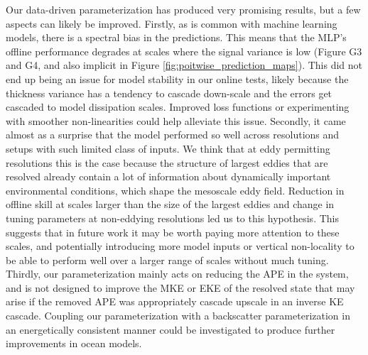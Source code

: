\documentclass[draft]{agujournal2019}
\begin{document}

Our data-driven parameterization has produced very promising results, but a few aspects can likely be improved. Firstly, as is common with machine learning models, there is a spectral bias in the predictions. This means that the MLP's offline performance degrades at scales where the signal variance is low (Figure G3 and G4, and also implicit in Figure \ref{fig:poitwise_prediction_maps}). This did not end up being an issue for model stability in our online tests, likely because the thickness variance has a tendency to cascade down-scale and the errors get cascaded to model dissipation scales. Improved loss functions or experimenting with smoother non-linearities could help alleviate this issue. Secondly, it came almost as a surprise that the model performed so well across resolutions and setups with such limited class of inputs. We think that at eddy permitting resolutions this is the case because the structure of largest eddies that are resolved already contain a lot of information about dynamically important environmental conditions, which shape the mesoscale eddy field. Reduction in offline skill at scales larger than the size of the largest eddies and change in tuning parameters at non-eddying resolutions led us to this hypothesis. This suggests that in future work it may be worth paying more attention to these scales, and potentially introducing more model inputs or vertical non-locality to be able to perform well over a larger range of scales without much tuning. Thirdly, our parameterization mainly acts on reducing the APE in the system, and is not designed to improve the MKE or EKE of the resolved state that may arise if the removed APE was appropriately cascade upscale in an inverse KE cascade. Coupling our parameterization with a backscatter parameterization in an energetically consistent manner could be investigated to produce further improvements in ocean models. 

\end{document}
